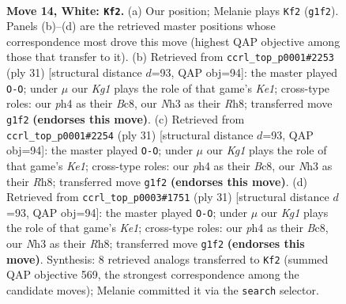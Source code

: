 \documentclass[11pt]{article}
\begin{document}
\clearpage

\begin{figure}[p]\centering
\begin{subfigure}{0.46\textwidth}\centering
\resizebox{\linewidth}{!}{%
\newchessgame
\chessboard[
  setfen={rnbk3r/1p1nq3/4p1p1/pNPpPp2/5P1p/1P5N/P1P3PP/R2Q1BKR w - - 0 14},
  showmover=false,
  pgfstyle=straightmove, color=movearrow, markmove={g1-f2}
]}
\caption{}
\end{subfigure}\hfill
\begin{subfigure}{0.46\textwidth}\centering
\resizebox{\linewidth}{!}{%
\newchessgame
\chessboard[
  setfen={r1b1k2r/p2n1ppp/4p3/q2pP3/1ppP1P2/8/P1QNN1PP/R3KB1R b KQkq - 1 16},
  showmover=false,
  pgfstyle=straightmove, color=movearrow, markmove={e8-g8}
]}
\caption{}
\end{subfigure}
\\[4pt]
\begin{subfigure}{0.46\textwidth}\centering
\resizebox{\linewidth}{!}{%
\newchessgame
\chessboard[
  setfen={r1b1k2r/p2n1ppp/4p3/q2pP3/1ppP1P2/8/P1QNN1PP/R3KB1R b KQkq - 1 16},
  showmover=false,
  pgfstyle=straightmove, color=movearrow, markmove={e8-g8}
]}
\caption{}
\end{subfigure}\hfill
\begin{subfigure}{0.46\textwidth}\centering
\resizebox{\linewidth}{!}{%
\newchessgame
\chessboard[
  setfen={r1b1k2r/p2n1ppp/4p3/q2pP3/1ppP1P2/8/P1QNN1PP/R3KB1R b KQkq - 1 16},
  showmover=false,
  pgfstyle=straightmove, color=movearrow, markmove={e8-g8}
]}
\caption{}
\end{subfigure}
\caption{\textbf{Move 14, White: \texttt{Kf2}.} (a) Our position; Melanie plays \texttt{Kf2} (\texttt{g1f2}). Panels (b)--(d) are the retrieved master positions whose correspondence most drove this move (highest QAP objective among those that transfer to it). (b) Retrieved from \texttt{ccrl\_top\_p0001\#2253} (ply 31) [structural distance $d$=93, QAP obj=94]: the master played \texttt{O-O}; under $\mu$ our \emph{Kg1} plays the role of that game's \emph{Ke1}; cross-type roles: our \emph{p}h4 as their \emph{B}c8, our \emph{N}h3 as their \emph{R}h8; transferred move \texttt{g1f2} \textbf{(endorses this move)}. (c) Retrieved from \texttt{ccrl\_top\_p0001\#2254} (ply 31) [structural distance $d$=93, QAP obj=94]: the master played \texttt{O-O}; under $\mu$ our \emph{Kg1} plays the role of that game's \emph{Ke1}; cross-type roles: our \emph{p}h4 as their \emph{B}c8, our \emph{N}h3 as their \emph{R}h8; transferred move \texttt{g1f2} \textbf{(endorses this move)}. (d) Retrieved from \texttt{ccrl\_top\_p0003\#1751} (ply 31) [structural distance $d$=93, QAP obj=94]: the master played \texttt{O-O}; under $\mu$ our \emph{Kg1} plays the role of that game's \emph{Ke1}; cross-type roles: our \emph{p}h4 as their \emph{B}c8, our \emph{N}h3 as their \emph{R}h8; transferred move \texttt{g1f2} \textbf{(endorses this move)}. Synthesis: 8 retrieved analogs transferred to \texttt{Kf2} (summed QAP objective 569, the strongest correspondence among the candidate moves); Melanie committed it via the \texttt{search} selector.}
\label{fig:thought-m26}
\end{figure}
\end{document}
